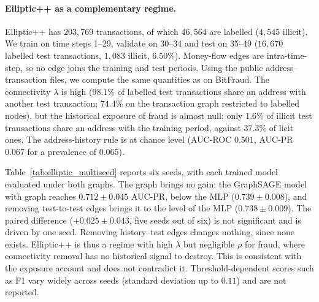 
\paragraph{Elliptic++ as a complementary regime.}
Elliptic++ has $203{,}769$ transactions, of which $46{,}564$ are labelled ($4{,}545$ illicit). We train on time steps 1--29, validate on 30--34 and test on 35--49 ($16{,}670$ labelled test transactions, $1{,}083$ illicit, $6.50\%$). Money-flow edges are intra-time-step, so no edge joins the training and test periods. Using the public address--transaction files, we compute the same quantities as on BitFraud. The connectivity $\lambda$ is high ($98.1\%$ of labelled test transactions share an address with another test transaction; $74.4\%$ on the transaction graph restricted to labelled nodes), but the historical exposure of fraud is almost null: only $1.6\%$ of illicit test transactions share an address with the training period, against $37.3\%$ of licit ones. The address-history rule is at chance level (AUC-ROC $0.501$, AUC-PR $0.067$ for a prevalence of $0.065$).

Table~\ref{tab:elliptic_multiseed} reports six seeds, with each trained model evaluated under both graphs. The graph brings no gain: the GraphSAGE model with graph reaches $0.712\pm0.045$ AUC-PR, below the MLP ($0.739\pm0.008$), and removing test-to-test edges brings it to the level of the MLP ($0.738\pm0.009$). The paired difference ($+0.025\pm0.043$, five seeds out of six) is not significant and is driven by one seed. Removing history--test edges changes nothing, since none exists. Elliptic++ is thus a regime with high $\lambda$ but negligible $\rho$ for fraud, where connectivity removal has no historical signal to destroy. This is consistent with the exposure account and does not contradict it. Threshold-dependent scores such as F1 vary widely across seeds (standard deviation up to $0.11$) and are not reported.

